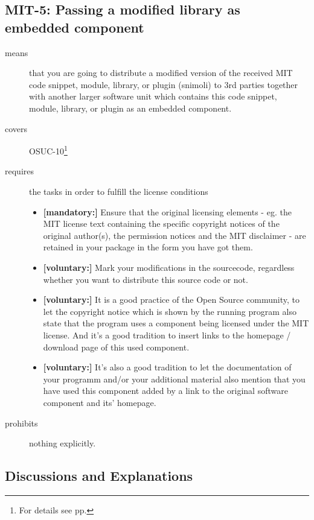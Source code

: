 \subsection{MIT-5: Passing a modified library as embedded component}
\label{OSUC-10-MIT}
\begin{description}
\item[means] that you are going to distribute a modified version of the received
MIT code snippet, module, library, or plugin (snimoli) to 3rd parties together
with another larger software unit which contains this code snippet, module,
library, or plugin as an embedded component.
\item[covers] OSUC-10\footnote{For details see pp. \pageref{OSUC-10-DEF}}
\item[requires] the tasks in order to fulfill the license conditions
\begin{itemize}
  \item \textbf{[mandatory:]} Ensure that the original licensing elements - eg.
  the MIT license text containing the specific copyright notices of the original
  author(s), the permission notices and the MIT disclaimer - are retained in
  your package in the form you have got them.
  \item \textbf{[voluntary:]} Mark your modifications in the sourcecode,
  regardless whether you want to distribute this source code or not.
  
  \item \textbf{[voluntary:]} It is a good practice of the Open Source
  community, to let the copyright notice which is shown by the running program
  also state that the program uses a component being licensed under the MIT
  license. And it's a good tradition to insert links to the homepage / download
  page of this used component.

  \item \textbf{[voluntary:]} It's also a good tradition to let the documentation of
  your programm and/or your additional material also mention that you have used
  this component added by a link to the original software component and its' homepage.
\end{itemize}
\item[prohibits] nothing explicitly.
\end{description}

\subsection{Discussions and Explanations}

